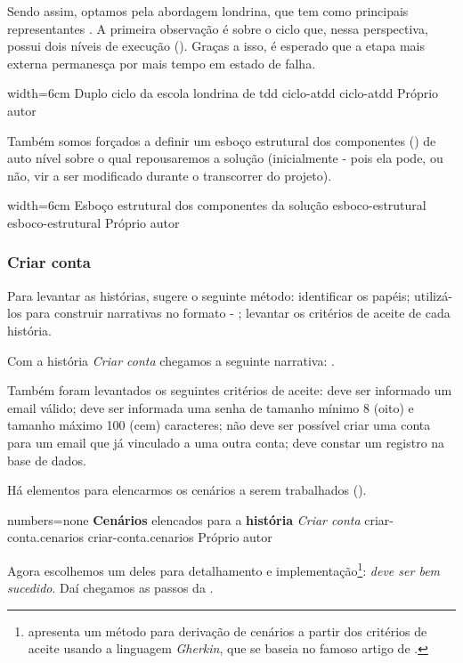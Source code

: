   Sendo assim, optamos pela abordagem londrina, que tem como principais representantes . A primeira observação é sobre o ciclo que, nessa perspectiva, possui dois níveis de execução (). Graças a isso, é esperado que a etapa mais externa permanesça por mais tempo em estado de falha.

  \imagem
    {width=6cm}
    {Duplo ciclo da escola londrina de tdd}
    {ciclo-atdd}
    {ciclo-atdd}
    {Próprio autor\footnotemark}

  Também somos forçados a definir um esboço estrutural dos componentes () de auto nível sobre o qual repousaremos a solução (inicialmente - pois ela pode, ou não, vir a ser modificado durante o transcorrer do projeto).

  \imagem
    {width=6cm}
    {Esboço estrutural dos componentes da solução}
    {esboco-estrutural}
    {esboco-estrutural}
    {Próprio autor}

  \subsubsection{Criar conta}

    Para levantar as histórias,  sugere o seguinte método: identificar os papéis; utilizá-los para construir narrativas no formato - ; levantar os critérios de aceite de cada história.

    Com a história \emph{Criar conta} chegamos a seguinte narrativa: .

    Também foram levantados os seguintes critérios de aceite: deve ser informado um email válido; deve ser informada uma senha de tamanho mínimo 8 (oito) e tamanho máximo 100 (cem) caracteres; não deve ser possível criar uma conta para um email que já vinculado a uma outra conta; deve constar um registro na base de dados.

    Há elementos para elencarmos os cenários a serem trabalhados ().

    \codigo
      {numbers=none}
      {\textbf{Cenários} elencados para a \textbf{história} \emph{Criar conta}}
      {criar-conta.cenarios}
      {criar-conta.cenarios}
      {Próprio autor}

    Agora escolhemos um deles para detalhamento e implementação\footnote{ apresenta um método para derivação de cenários a partir dos critérios de aceite usando a linguagem \emph{Gherkin}, que se baseia no famoso artigo de .}: \emph{deve ser bem sucedido}. Daí chegamos as passos da .

